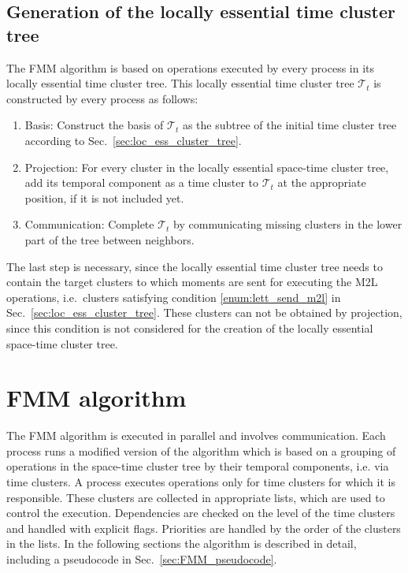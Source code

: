 \documentclass[a4paper,11pt]{article}
\theoremstyle{plain}
\theoremstyle{definition}
\theoremstyle{remark}
\begin{document}
\subsection{Generation of the locally essential time cluster tree}
The FMM algorithm is based on operations executed by every process in its locally essential time cluster tree. This locally essential time cluster tree $\mathcal{T}_t$ is constructed by every process as follows:
\begin{enumerate}
  \item Basis: Construct the basis of $\mathcal{T}_t$ as the subtree of the initial time cluster tree according to Sec.~\ref{sec:loc_ess_cluster_tree}.
  \item Projection: For every cluster in the locally essential space-time cluster tree, add its temporal component as a time cluster to $\mathcal{T}_t$ at the appropriate position, if it is not included yet.
  \item Communication: Complete $\mathcal{T}_t$ by communicating missing clusters in the lower part of the tree between neighbors. 
\end{enumerate}
The last step is necessary, since the locally essential time cluster tree needs to contain the target clusters to which moments are sent for executing the M2L operations, i.e.~clusters satisfying condition \ref{enum:lett_send_m2l} in Sec.~\ref{sec:loc_ess_cluster_tree}. These clusters can not be obtained by projection, since this condition is not considered for the creation of the locally essential space-time cluster tree.

\section{FMM algorithm} \label{sec:fmm}
The FMM algorithm is executed in parallel and involves communication. Each process runs a modified version of the 
algorithm which is based on a grouping of operations in the space-time cluster tree by their temporal components, i.e. via time clusters. A process executes operations only for time clusters for which it is responsible. These clusters are collected in appropriate lists, which are used to control the execution. Dependencies are checked on the level of the time clusters and handled with explicit flags. Priorities are handled by the order of the clusters in the lists. In the following sections the algorithm is described in detail, including a pseudocode in Sec.~\ref{sec:FMM_pseudocode}.
\end{document}
